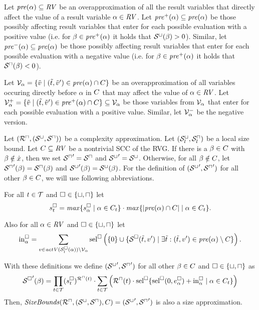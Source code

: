 \begin{definition}
  Let $\mathit{pre}(\alpha) \subseteq \mathit{RV}$ be an overapproximation of all the result variables that directly affect the value of a result variable $\alpha \in \mathit{RV}$.
  Let $\mathit{pre}^+(\alpha) \subseteq \mathit{pre}(\alpha)$ be those possibly affecting result variables that enter for each possible evaluation with a positive value
  (i.e. for $\beta \in \mathit{pre}^+(\alpha)$ it holds that ${\mathcal{S}^\sqcup}(\beta) > 0$).
  Similar, let $\mathit{pre}^-(\alpha) \subseteq \mathit{pre}(\alpha)$ be those possibly affecting result variables that enter for each possible evaluation with a negative value
  (i.e. for $\beta \in \mathit{pre}^+(\alpha)$ it holds that ${\mathcal{S}^\sqcap}(\beta) < 0$).
\end{definition}

\begin{definition}
  Let $\mathcal{V}_\alpha = \lbrace  \tilde{v} \mid (\tilde{t}, \tilde{v}') \in \mathit{pre}(\alpha) \cap C  \rbrace$ be an overapproximation of all variables occuring directly before $\alpha$ in $C$ that may affect the value of $\alpha \in \mathit{RV}$.
  Let $\mathcal{V}^+_\alpha = \lbrace  \tilde{v} \mid (\tilde{t}, \tilde{v}') \in \mathit{pre}^+(\alpha) \cap C  \rbrace \subseteq \mathcal{V}_\alpha$ be those variables from $\mathcal{V}_\alpha$ that enter for each possible evaluation with a positive value.
  Similar, let $\mathcal{V}^-_\alpha$ be the negative version.
\end{definition}

\begin{theorem}
  Let $({\mathcal{R}^\sqcap}, {({\mathcal{S}^\sqcup}, {\mathcal{S}^\sqcap})})$ be a complexity approximation.
  Let ${({\mathcal{S}^\sqcup_l}, {\mathcal{S}^\sqcap_l})}$ be a local size bound.
  Let $C \subseteq \mathit{RV}$ be a nontrivial SCC of the RVG.
  If there is a $\beta \in C$ with $\beta \notin \dot{x}$, then we set ${\mathcal{S}^\sqcap}' = {\mathcal{S}^\sqcap}$ and ${\mathcal{S}^\sqcup}' = {\mathcal{S}^\sqcup}$.
  Otherwise, for all $\beta \notin C$, let ${\mathcal{S}^\sqcap}'(\beta) = {\mathcal{S}^\sqcap}(\beta)$ and ${\mathcal{S}^\sqcup}'(\beta) = {\mathcal{S}^\sqcup}(\beta)$.
  For the definition of $({\mathcal{S}^\sqcup}', {\mathcal{S}^\sqcap}')$ for all other $\beta \in C$, we will use following abbreviations.

  For all $t \in \mathcal{T}$ and $\square \in \lbrace \sqcup, \sqcap \rbrace$ let
  \[ s^\square_t = \mathit{max} \lbrace s^\square_{\alpha} \mid \alpha \in C_t \rbrace \cdot \mathit{max} \lbrace \left|\mathit{pre}(\alpha) \cap C\right| \mid \alpha \in C_t \rbrace. \]

  Also for all $\alpha \in \mathit{RV}$ and $\square \in \lbrace \sqcup, \sqcap \rbrace$ let
  \[ \text{in}^\square_\alpha = \sum_{v \in \mathit{actV}(\mathcal{S}^\square_l(\alpha)) \setminus \mathcal{V}_\alpha} \text{sel}^\square \left( \lbrace 0 \rbrace \cup \lbrace \mathcal{S}^\square(\tilde{t}, v') \mid \exists \tilde{t}: (\tilde{t}, v') \in \mathit{pre}(\alpha) \setminus C \rbrace \right). \]

  With these definitions we define $({\mathcal{S}^\sqcup}', {\mathcal{S}^\sqcap}')$ for all other $\beta \in C$ and $\square \in \lbrace \sqcup, \sqcap \rbrace$ as
  \[ {\mathcal{S}^\square}'(\beta) = \prod_{t \in \mathcal{T}} (s^\square_t)^{{\mathcal{R}^\sqcap}(t)} \cdot \sum_{t \in \mathcal{T}} \left( {\mathcal{R}^\sqcap}(t) \cdot \text{sel}^\square \lbrace \text{sel}^\square(0, e^{\square}_\alpha) + \text{in}^\square_\alpha \mid \alpha \in C_t  \rbrace \right) \]
  Then, $\mathit{SizeBounds}({\mathcal{R}^\sqcap}, {({\mathcal{S}^\sqcup}, {\mathcal{S}^\sqcap})}, C) = ({\mathcal{S}^\sqcup}', {\mathcal{S}^\sqcap}')$ is also a size approximation. 
\end{theorem}
